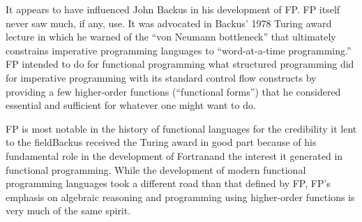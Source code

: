 It appears to have influenced John Backus in his development of FP. FP itself never saw much, if any, use. It was advocated in Backus' 1978 Turing award lecture in which he warned of the ``von Neumann bottleneck'' that ultimately constrains imperative programming languages to ``word-at-a-time programming.'' FP intended to do for functional programming what structured programming did for imperative programming with its standard control flow constructs by providing a few higher-order functions (``functional forms'') that he considered essential and sufficient for whatever one might want to do.

FP is most notable in the history of functional languages for the credibility it lent to the field\empause Backus received the Turing award in good part because of his fundamental role in the development of Fortran\empause and the interest it generated in functional programming. While the development of modern functional programming languages took a different road than that defined by FP, FP's emphasis on algebraic reasoning and programming using higher-order functions is very much of the same spirit.